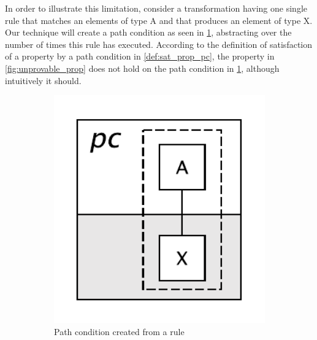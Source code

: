 In order to illustrate this limitation, consider a transformation having one single rule that matches an elements of type A and that produces an element of type X. Our technique will create a path condition as seen in \cref{fig:unprovable_pc}, abstracting over the number of times this rule has executed. According to the definition of satisfaction of a property by a path condition in \cref{def:sat_prop_pc}, the property in \cref{fig:unprovable_prop} does not hold on the path condition in \cref{fig:unprovable_pc}, although intuitively it should.

\begin{figure}[htb]
        \centering
        \begin{subfigure}[b]{0.144\textwidth}
                \centering
                \includegraphics[width=1\textwidth]{./figures/property_proving/unprovable_rule.pdf}
                \caption{Path condition created from a rule}
                \label{fig:unprovable_pc}
        \end{subfigure}%
        ~~
        \begin{subfigure}[b]{0.20\textwidth}
                \centering

\end{subfigure}
\end{figure}
